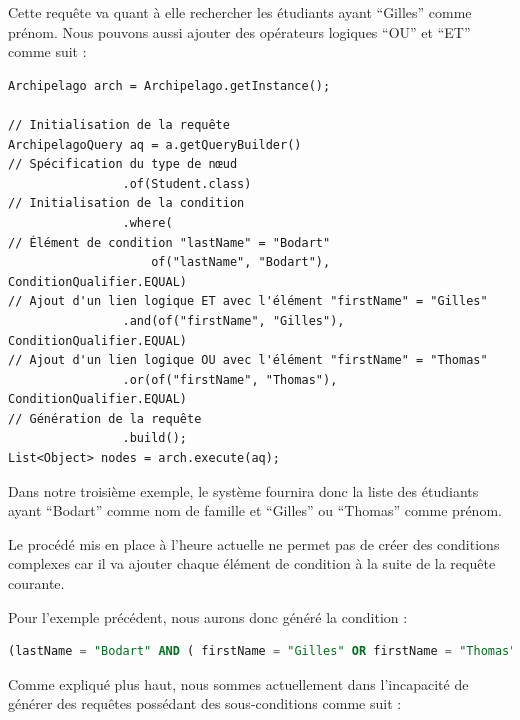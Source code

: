 \documentclass[a4paper,fleqn,12pt,oneside]{report}
\begin{document}
Cette requête va quant à elle rechercher les étudiants ayant \enquote{Gilles} comme prénom.
\newpage
Nous pouvons aussi ajouter des opérateurs logiques \enquote{OU} et \enquote{ET} comme suit :
\begin{lstlisting}
Archipelago arch = Archipelago.getInstance();

// Initialisation de la requête
ArchipelagoQuery aq = a.getQueryBuilder()
// Spécification du type de nœud
                .of(Student.class)
// Initialisation de la condition
                .where(
// Élément de condition "lastName" = "Bodart"
                	of("lastName", "Bodart"), ConditionQualifier.EQUAL)
// Ajout d'un lien logique ET avec l'élément "firstName" = "Gilles"
                .and(of("firstName", "Gilles"), ConditionQualifier.EQUAL)
// Ajout d'un lien logique OU avec l'élément "firstName" = "Thomas"
                .or(of("firstName", "Thomas"), ConditionQualifier.EQUAL)
// Génération de la requête
                .build();
List<Object> nodes = arch.execute(aq);
\end{lstlisting}
Dans notre troisième exemple, le système fournira donc la liste des étudiants ayant \enquote{Bodart} comme nom de famille et \enquote{Gilles} ou \enquote{Thomas} comme prénom. 

Le procédé mis en place à l'heure actuelle ne permet pas de créer des conditions complexes car il va ajouter chaque élément de condition à la suite de la requête courante. 

Pour l'exemple précédent, nous aurons donc généré la condition : 

\begin{lstlisting}[language=SQL]
(lastName = "Bodart" AND ( firstName = "Gilles" OR firstName = "Thomas"))
\end{lstlisting}

Comme expliqué plus haut, nous sommes actuellement dans l'incapacité de générer des requêtes possédant des sous-conditions comme suit :
\end{document}
